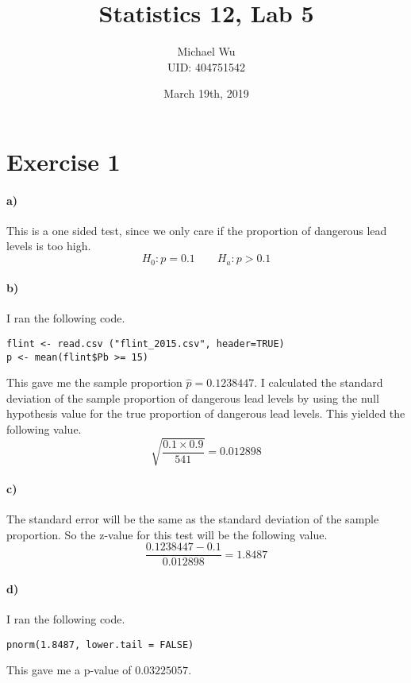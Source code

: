 \documentclass[12pt]{article}
\begin{document}
\title{Statistics 12, Lab 5}
\date{March 19th, 2019}
\author{Michael Wu\\UID: 404751542}
\maketitle

\section*{Exercise 1}

\paragraph{a)}

This is a one sided test, since we only care if the proportion of dangerous lead levels is too high.
\[H_0:p=0.1\qquad H_a:p>0.1\]

\paragraph{b)}

I ran the following code.
\begin{verbatim}
flint <- read.csv ("flint_2015.csv", header=TRUE)
p <- mean(flint$Pb >= 15)
\end{verbatim}
This gave me the sample proportion \(\hat{p}=0.1238447\). I calculated the standard deviation of the
sample proportion of dangerous lead levels by using the null hypothesis value for the true proportion
of dangerous lead levels. This yielded the following value.
\[\sqrt{\frac{0.1\times0.9}{541}}=0.012898\]

\paragraph{c)}

The standard error will be the same as the standard deviation of the sample proportion. So the
z-value for this test will be the following value.
\[\frac{0.1238447-0.1}{0.012898}=1.8487\]

\paragraph{d)}

I ran the following code.
\begin{verbatim}
pnorm(1.8487, lower.tail = FALSE)
\end{verbatim}
This gave me a p-value of \(0.03225057\).
\end{document}
